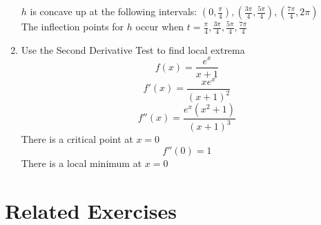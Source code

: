 \documentclass{article}
\begin{document}
\begin{enumerate}
    $h$ is concave up at the following intervals: $\left(0, \frac{\pi}{4}\right), \left(\frac{3\pi}{4}, \frac{5\pi}{4}\right), \left(\frac{7\pi}{4}, 2\pi\right)$ \\
    The inflection points for $h$ occur when $t = \frac{\pi}{4}, \frac{3\pi}{4}, \frac{5\pi}{4}, \frac{7\pi}{4}$
    \item Use the Second Derivative Test to find local extrema
    $$f(x) = \frac{e^x}{x + 1}$$
    $$f'(x) = \frac{xe^x}{\left(x + 1\right)^2}$$
    $$f''(x) = \frac{e^x\left(x^2+1\right)}{\left(x+1\right)^3}$$
    There is a critical point at $x = 0$
    $$f''(0) = 1$$
    There is a local minimum at $x = 0$
\end{enumerate}

\section*{Related Exercises}
\end{document}
